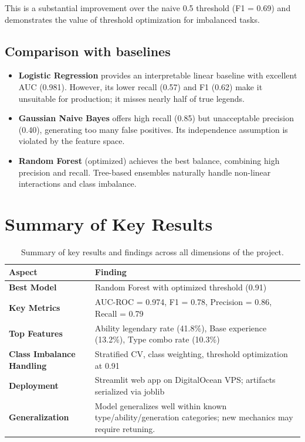 This is a substantial improvement over the naive 0.5 threshold (F1 = 0.69) and demonstrates the value of threshold optimization for imbalanced tasks.

\subsection{Comparison with baselines}

\begin{itemize}
  \item \textbf{Logistic Regression} provides an interpretable linear baseline with excellent AUC (0.981). However, its lower recall (0.57) and F1 (0.62) make it unsuitable for production; it misses nearly half of true legends.
  \item \textbf{Gaussian Naive Bayes} offers high recall (0.85) but unacceptable precision (0.40), generating too many false positives. Its independence assumption is violated by the feature space.
  \item \textbf{Random Forest} (optimized) achieves the best balance, combining high precision and recall. Tree-based ensembles naturally handle non-linear interactions and class imbalance.
\end{itemize}

\section{Summary of Key Results}
\label{sec:results_summary}

\begin{table}[h]
  \centering
  \begin{tabular}{|l|p{10cm}|}
    \hline
    \textbf{Aspect} & \textbf{Finding} \\
    \hline
    \textbf{Best Model} & Random Forest with optimized threshold (0.91) \\
    \hline
    \textbf{Key Metrics} & AUC-ROC = 0.974, F1 = 0.78, Precision = 0.86, Recall = 0.79 \\
    \hline
    \textbf{Top Features} & Ability legendary rate (41.8\%), Base experience (13.2\%), Type combo rate (10.3\%) \\
    \hline
    \textbf{Class Imbalance Handling} & Stratified CV, class weighting, threshold optimization at 0.91 \\
    \hline
    \textbf{Deployment} & Streamlit web app on DigitalOcean VPS; artifacts serialized via joblib \\
    \hline
    \textbf{Generalization} & Model generalizes well within known type/ability/generation categories; new mechanics may require retuning. \\
    \hline
  \end{tabular}
  \caption{Summary of key results and findings across all dimensions of the project.}
  \label{tab:results_summary}
\end{table}
